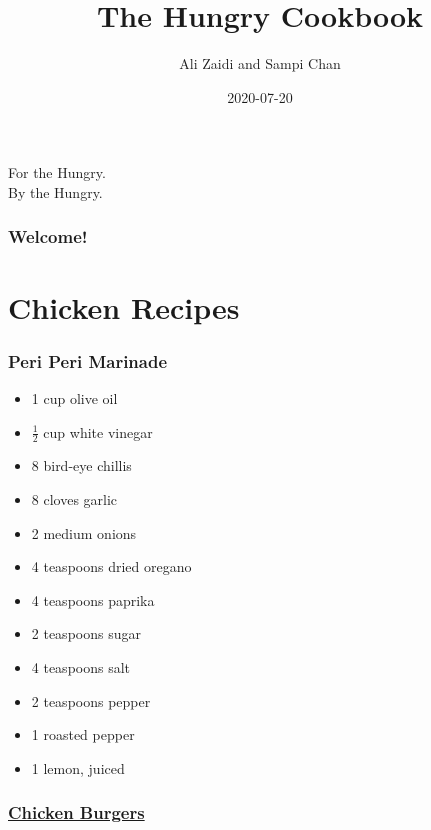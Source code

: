 \documentclass[
]{article}
\title{The Hungry Cookbook}
\author{Ali Zaidi and Sampi Chan}
\date{2020-07-20}
\providecommand{\tightlist}{%
  \setlength{\itemsep}{0pt}\setlength{\parskip}{0pt}}
\begin{document}
\maketitle


\begin{center}
For the Hungry. \\
By the Hungry.

\end{center}


{
\setcounter{tocdepth}{2}
\tableofcontents
}
\hypertarget{welcome}{%
\section*{Welcome!}\label{welcome}}

\hypertarget{part-chicken-recipes}{%
\part{Chicken Recipes}\label{part-chicken-recipes}}

\hypertarget{peri-peri-marinade}{%
\section{Peri Peri Marinade}\label{peri-peri-marinade}}

\begin{itemize}
\tightlist
\item
  1 cup olive oil
\item
  \(\frac{1}{2}\) cup white vinegar
\item
  8 bird-eye chillis
\item
  8 cloves garlic
\item
  2 medium onions
\item
  4 teaspoons dried oregano
\item
  4 teaspoons paprika
\item
  2 teaspoons sugar
\item
  4 teaspoons salt
\item
  2 teaspoons pepper
\item
  1 roasted pepper
\item
  1 lemon, juiced
\end{itemize}

\hypertarget{chicken-burgers}{%
\section{\texorpdfstring{\href{https://www.foodnetwork.com/recipes/rachael-ray/bbq-chicken-burgers-with-slaw-recipe-1917239}{Chicken Burgers}}{Chicken Burgers}}\label{chicken-burgers}}
\end{document}
